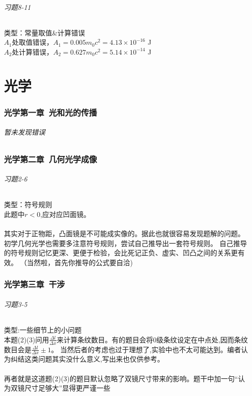 \documentclass[a4paper,11pt]{ctexart}
\begin{document}
\paragraph{习题8-11}类型：常量取值\&计算错误\\
$A_1$处取值错误，$A_1=0.005m_0c^2=4.13\times10^{-16}$ J\\
$A_2$处计算错误，$A_2=0.627m_0c^2=5.14\times10^{-14}$ J


\part{光学}
\section{光学第一章\ 光和光的传播}
\paragraph{暂未发现错误}

\section{光学第二章\ 几何光学成像}
\paragraph{习题2-6}类型：符号规则\\
此题中$r < 0$,应对应凹面镜。\\\\
其实对于正物距，凸面镜是不可能成实像的。据此也就很容易发现题解的问题。\\
初学几何光学也需要多注意符号规则，尝试自己推导出一套符号规则。
自己推导的符号规则记忆更深、更便于检验，会比死记正负、虚实、凹凸之间的关系更有效。
（当然啦，首先你推导的公式要自洽)

\section{光学第三章\ 干涉}
\paragraph{习题3-5}类型:一些细节上的小问题\\
本题(2)(3)问用$\frac{\Delta l}{\Delta x} $来计算条纹数目。有的题目会将0级条纹设定在中点处,因而条纹数目会是$\frac{\Delta l}{\Delta x} \pm 1$。
当然后者的考虑也过于理想了,实验中也不太可能达到。编者认为纠结这类问题其实没什么意义,写出来也仅供参考。\\\\
再者就是这道题(2)(3)的题目默认忽略了双镜尺寸带来的影响。题干中加一句“认为双镜尺寸足够大”显得更严谨一些
\end{document}
